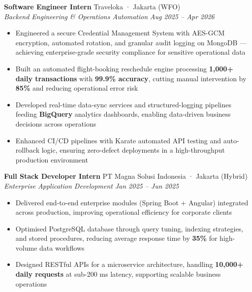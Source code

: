 \documentclass[10pt,a4paper]{article}
\newcommand{\experienceheader}[4]{
    \textbf{#1} \hfill #2 \\
    \textit{#3} \hfill \textit{#4}
}
\begin{document}
\experienceheader{Software Engineer Intern}{Traveloka · Jakarta (WFO)}{Backend Engineering \& Operations Automation}{Aug 2025 -- Apr 2026}
\begin{itemize}[leftmargin=*, itemsep=1pt, topsep=1pt]
    \item Engineered a secure Credential Management System with AES-GCM encryption, automated rotation, and granular audit logging on MongoDB — achieving enterprise-grade security compliance for sensitive operational data
    \item Built an automated flight-booking reschedule engine processing \textbf{1,000+ daily transactions} with \textbf{99.9\% accuracy}, cutting manual intervention by \textbf{85\%} and reducing operational error risk
    \item Developed real-time data-sync services and structured-logging pipelines feeding \textbf{BigQuery} analytics dashboards, enabling data-driven business decisions across operations
    \item Enhanced CI/CD pipelines with Karate automated API testing and auto-rollback logic, ensuring zero-defect deployments in a high-throughput production environment
\end{itemize}

\vspace{2pt}

\experienceheader{Full Stack Developer Intern}{PT Magna Solusi Indonesia · Jakarta (Hybrid)}{Enterprise Application Development}{Jan 2025 -- Jun 2025}
\begin{itemize}[leftmargin=*, itemsep=1pt, topsep=1pt]
    \item Delivered end-to-end enterprise modules (Spring Boot + Angular) integrated across production, improving operational efficiency for corporate clients
    \item Optimised PostgreSQL database through query tuning, indexing strategies, and stored procedures, reducing average response time by \textbf{35\%} for high-volume data workflows
    \item Designed RESTful APIs for a microservice architecture, handling \textbf{10,000+ daily requests} at sub-200 ms latency, supporting scalable business operations
\end{itemize}

\vspace{-4pt}

\end{document}
